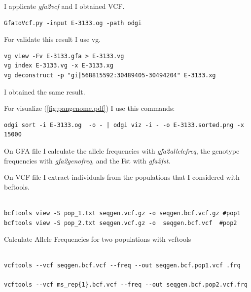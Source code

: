 \begin{itemize}
I applicate \textit{gfa2vcf} and I obtained VCF.

\begin{verbatim}
GfatoVcf.py -input E-3133.og -path odgi
\end{verbatim}

For validate this result I use vg.

\begin{verbatim}
vg view -Fv E-3133.gfa > E-3133.vg
vg index E-3133.vg -x E-3133.xg
vg deconstruct -p "gi|568815592:30489405-30494204" E-3133.xg 
\end{verbatim}

I obtained the same result. 

For visualize (\ref{fig:pangenome.pdf}) I use this commands:

\begin{verbatim}
odgi sort -i E-3133.og  -o - | odgi viz -i - -o E-3133.sorted.png -x 15000
\end{verbatim}
\end{itemize}

  


On GFA file I calculate the allele frequencies with \textit{gfa2allelefreq}, the genotype frequencies with \textit{gfa2genofreq}, and the Fst with \textit{gfa2fst}. 

On VCF file I extract individuals from the populations that I considered with bcftools. %
\begin{verbatim}

bcftools view -S pop_1.txt seqgen.vcf.gz -o seqgen.bcf.vcf.gz #pop1
bcftools view -S pop_2.txt seqgen.vcf.gz -o  seqgen.bcf.vcf  #pop2 
\end{verbatim}

Calculate Allele Frequencies for two populations with vcftools
\begin{verbatim}

vcftools --vcf seqgen.bcf.vcf --freq --out seqgen.bcf.pop1.vcf .frq

vcftools --vcf ms_rep{1}.bcf.vcf --freq --out seqgen.bcf.pop2.vcf.frq 

\end{verbatim}
